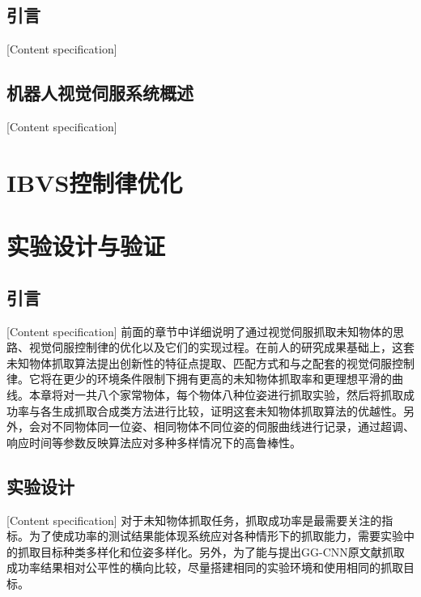 \documentclass[fontset=fandol,type=bachelor,campus=harbin]{hithesisbook}
\begin{document}
\section{引言}[Content specification]


\section{机器人视觉伺服系统概述}[Content specification]



\chapter[IBVS控制律优化]{IBVS控制律优化}
\chapter{实验设计与验证}
\section{引言}[Content specification]
前面的章节中详细说明了通过视觉伺服抓取未知物体的思路、视觉伺服控制律的优化以及它们的实现过程。在前人的研究成果基础上，这套未知物体抓取算法提出创新性的特征点提取、匹配方式和与之配套的视觉伺服控制律。它将在更少的环境条件限制下拥有更高的未知物体抓取率和更理想平滑的曲线。本章将对一共八个家常物体，每个物体八种位姿进行抓取实验，然后将抓取成功率与各生成抓取合成类方法进行比较，证明这套未知物体抓取算法的优越性。另外，会对不同物体同一位姿、相同物体不同位姿的伺服曲线进行记录，通过超调、响应时间等参数反映算法应对多种多样情况下的高鲁棒性。

\section{实验设计}[Content specification]
对于未知物体抓取任务，抓取成功率是最需要关注的指标。为了使成功率的测试结果能体现系统应对各种情形下的抓取能力，需要实验中的抓取目标种类多样化和位姿多样化。另外，为了能与提出GG-CNN原文献抓取成功率结果相对公平性的横向比较，尽量搭建相同的实验环境和使用相同的抓取目标。
\end{document}
